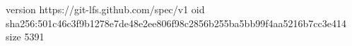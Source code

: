 version https://git-lfs.github.com/spec/v1
oid sha256:501c46c3f9b1278e7de48e2ee806f98c2856b255ba5bb99f4aa5216b7cc3e414
size 5391

